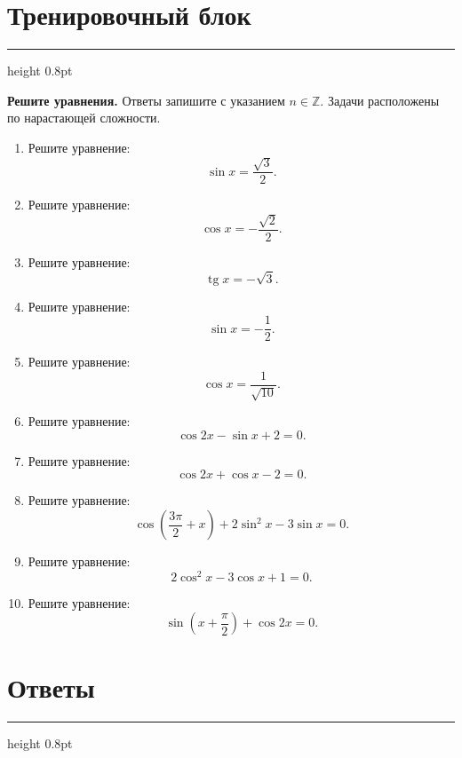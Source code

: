 \documentclass[a4paper,12pt]{article}
\newcommand{\sectionline}{\vspace{0.2em}\textcolor{accent}{\hrule height 0.8pt}\vspace{0.7em}}
\newcommand{\Z}{\mathbb{Z}}
\newcommand{\tg}{\mathop{\mathrm{tg}}\nolimits}
\begin{document}
\newpage

\section*{Тренировочный блок}
\sectionline

\textbf{Решите уравнения.} Ответы запишите с указанием \(n\in\Z\). Задачи расположены по нарастающей сложности.

\begin{enumerate}
    \item Решите уравнение:
    \[
    \sin x=\frac{\sqrt3}{2}.
    \]

    \item Решите уравнение:
    \[
    \cos x=-\frac{\sqrt2}{2}.
    \]

    \item Решите уравнение:
    \[
    \tg x=-\sqrt3.
    \]

    \item Решите уравнение:
    \[
    \sin x=-\frac12.
    \]

    \item Решите уравнение:
    \[
    \cos x=\frac{1}{\sqrt{10}}.
    \]

    \item Решите уравнение:
    \[
    \cos 2x-\sin x+2=0.
    \]

    \item Решите уравнение:
    \[
    \cos 2x+\cos x-2=0.
    \]

    \item Решите уравнение:
    \[
    \cos\left(\frac{3\pi}{2}+x\right)+2\sin^2x-3\sin x=0.
    \]

    \item Решите уравнение:
    \[
    2\cos^2x-3\cos x+1=0.
    \]

    \item Решите уравнение:
    \[
    \sin\left(x+\frac{\pi}{2}\right)+\cos2x=0.
    \]
\end{enumerate}

\newpage

\section*{Ответы}
\sectionline
\end{document}
